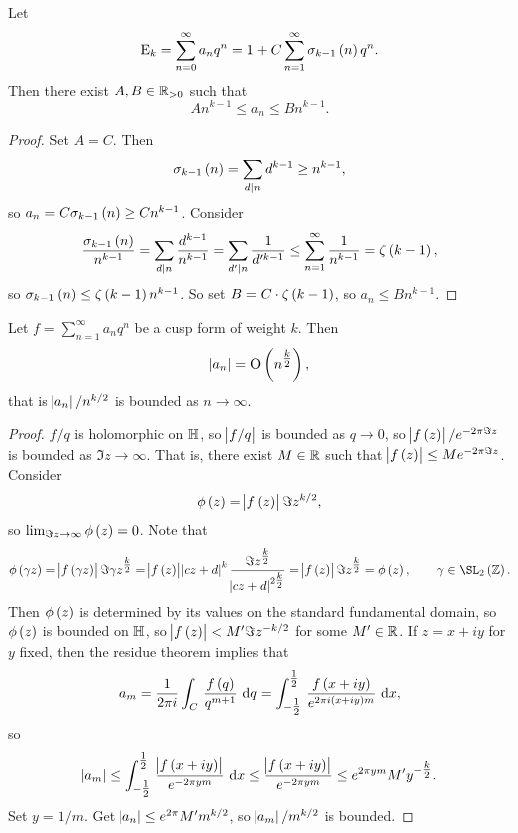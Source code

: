 
\begin{proposition}
Let
$$ \E_k = \sum_{n = 0}^\infty a_nq^n = 1 + C\sum_{n = 1}^\infty \sigma_{k - 1}\br{n}q^n. $$
Then there exist $ A, B \in \mathbb{R}_{> 0} $ such that
$$ An^{k - 1} \le a_n \le Bn^{k - 1}. $$
\end{proposition}

\begin{proof}
Set $ A = C $. Then
$$ \sigma_{k - 1}\br{n} = \sum_{d \mid n} d^{k - 1} \ge n^{k - 1}, $$
so $ a_n = C\sigma_{k - 1}\br{n} \ge Cn^{k - 1} $. Consider
$$ \dfrac{\sigma_{k - 1}\br{n}}{n^{k - 1}} = \sum_{d \mid n} \dfrac{d^{k - 1}}{n^{k - 1}} = \sum_{d' \mid n} \dfrac{1}{d'^{k - 1}} \le \sum_{n = 1}^\infty \dfrac{1}{n^{k - 1}} = \zeta\br{k - 1}, $$
so $ \sigma_{k - 1}\br{n} \le \zeta\br{k - 1}n^{k - 1} $. So set $ B = C \cdot \zeta\br{k - 1} $, so $ a_n \le Bn^{k - 1} $.
\end{proof}

\begin{theorem}[Hasse]
Let $ f = \sum_{n = 1}^\infty a_nq^n $ be a cusp form of weight $ k $. Then
$$ \abs{a_n} = \O\br{n^{\tfrac{k}{2}}}, $$
that is $ \abs{a_n} / n^{k / 2} $ is bounded as $ n \to \infty $.
\end{theorem}

\pagebreak

\begin{proof}
$ f / q $ is holomorphic on $ \mathbb{H} $, so $ \abs{f / q} $ is bounded as $ q \to 0 $, so $ \abs{f\br{z}} / e^{-2\pi \Im z} $ is bounded as $ \Im z \to \infty $. That is, there exist $ M \in \mathbb{R} $ such that $ \abs{f\br{z}} \le Me^{-2\pi \Im z} $. Consider
$$ \phi\br{z} = \abs{f\br{z}}\Im z^{k / 2}, $$
so $ \lim_{\Im z \to \infty} \phi\br{z} = 0 $. Note that
$$ \phi\br{\gamma z} = \abs{f\br{\gamma z}}\Im \gamma z^{\tfrac{k}{2}} = \abs{f\br{z}}\abs{cz + d}^k\dfrac{\Im z^{\tfrac{k}{2}}}{\abs{cz + d}^{2\tfrac{k}{2}}} = \abs{f\br{z}}\Im z^{\tfrac{k}{2}} = \phi\br{z}, \qquad \gamma \in \SL_2\br{\ZZ}. $$
Then $ \phi\br{z} $ is determined by its values on the standard fundamental domain, so $ \phi\br{z} $ is bounded on $ \mathbb{H} $, so $ \abs{f\br{z}} < M'\Im z^{-k / 2} $ for some $ M' \in \mathbb{R} $. If $ z = x + iy $ for $ y $ fixed, then the residue theorem implies that
$$ a_m = \dfrac{1}{2\pi i}\intd{C}{}{\dfrac{f\br{q}}{q^{m + 1}}}{q} = \intd{-\tfrac{1}{2}}{\tfrac{1}{2}}{\dfrac{f\br{x + iy}}{e^{2\pi i\br{x + iy}m}}}{x}, $$
so
$$ \abs{a_m} \le \intd{-\tfrac{1}{2}}{\tfrac{1}{2}}{\dfrac{\abs{f\br{x + iy}}}{e^{-2\pi ym}}}{x} \le \dfrac{\abs{f\br{x + iy}}}{e^{-2\pi ym}} \le e^{2\pi ym}M'y^{-\tfrac{k}{2}}. $$
Set $ y = 1 / m $. Get $ \abs{a_n} \le e^{2\pi}M'm^{k / 2} $, so $ \abs{a_m} / m^{k / 2} $ is bounded.
\end{proof}

